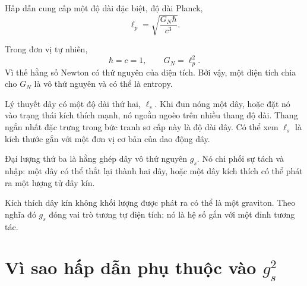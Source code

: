 Hấp dẫn cung cấp một độ dài đặc biệt, độ dài Planck,
\begin{equation}
\ell_p=\sqrt{\frac{G_N\hbar}{c^3}}.
\label{eq:l06-planck-si}
\end{equation}

\begin{classroomqa}
\end{classroomqa}

Trong đơn vị tự nhiên,
\begin{equation}
\hbar=c=1,
\qquad
G_N=\ell_p^2.
\label{eq:l06-planck-area}
\end{equation}
Vì thế hằng số Newton có thứ nguyên của diện tích. Bởi vậy, một diện tích chia cho \(G_N\) là vô thứ nguyên và có thể là entropy.

Lý thuyết dây có một độ dài thứ hai, \(\ell_s\). Khi đun nóng một dây, hoặc đặt nó vào trạng thái kích thích mạnh, nó ngoằn ngoèo trên nhiều thang độ dài. Thang ngắn nhất đặc trưng trong bức tranh sơ cấp này là độ dài dây. Có thể xem \(\ell_s\) là kích thước gắn với một đơn vị cơ bản của dao động dây.

Đại lượng thứ ba là hằng ghép dây vô thứ nguyên \(g_s\). Nó chi phối sự tách và nhập: một dây có thể thắt lại thành hai dây, hoặc một dây kích thích có thể phát ra một lượng tử dây kín.

\begin{classroomqa}
\end{classroomqa}

Kích thích dây kín không khối lượng được phát ra có thể là một graviton. Theo nghĩa đó \(g_s\) đóng vai trò tương tự điện tích: nó là hệ số gắn với một đỉnh tương tác.

\section{Vì sao hấp dẫn phụ thuộc vào \texorpdfstring{\(g_s^2\)}{bình phương của hằng ghép}}

